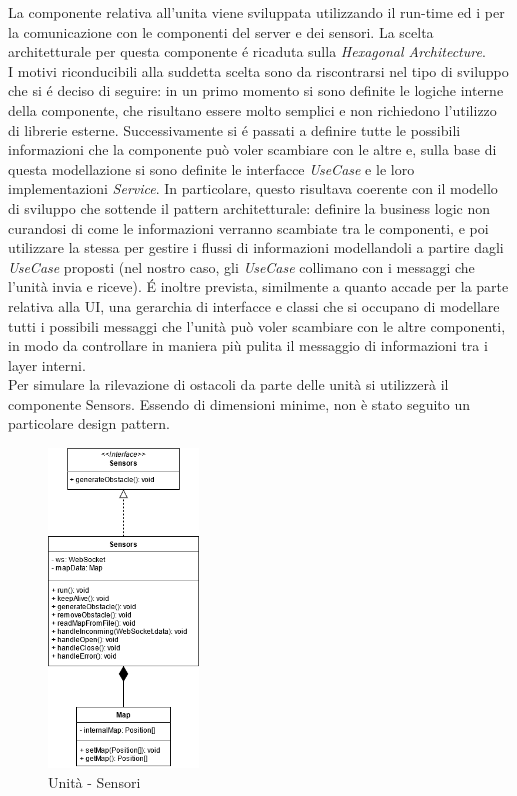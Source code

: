 La componente relativa all'unita viene sviluppata utilizzando il run-time  ed i  per la comunicazione con le componenti del server e dei sensori.
La scelta architetturale per questa componente é ricaduta sulla \textit{Hexagonal Architecture}. \\
I motivi riconducibili alla suddetta scelta sono da riscontrarsi nel tipo di sviluppo che si é deciso di seguire: in un primo momento si sono definite le logiche interne della componente, che risultano essere molto semplici e non richiedono l'utilizzo di librerie esterne. Successivamente si é passati a definire tutte le possibili informazioni che la componente può voler scambiare con le altre e, sulla base di questa modellazione si sono definite le interfacce \textit{UseCase} e le loro implementazioni \textit{Service}. In particolare, questo risultava coerente con il modello di sviluppo che sottende il pattern architetturale: definire la business logic non curandosi di come le informazioni verranno scambiate tra le componenti, e poi utilizzare la stessa per gestire i flussi di informazioni modellandoli a partire dagli \textit{UseCase} proposti (nel nostro caso, gli \textit{UseCase} collimano con i messaggi che l'unità invia e riceve).
É inoltre prevista, similmente a quanto accade per la parte relativa alla UI, una gerarchia di interfacce e classi che si occupano di modellare tutti i possibili messaggi che l'unità può voler scambiare con le altre componenti, in modo da controllare in maniera più pulita il messaggio di informazioni tra i layer interni. \\
Per simulare la rilevazione di ostacoli da parte delle unità si utilizzerà il componente Sensors. Essendo di dimensioni minime, non è stato seguito un particolare design pattern.

\begin{figure}[H]
	\centering
	\includegraphics[width=4cm]{img/unit_sensori.png}
	\caption{Unità - Sensori}
\end{figure}

